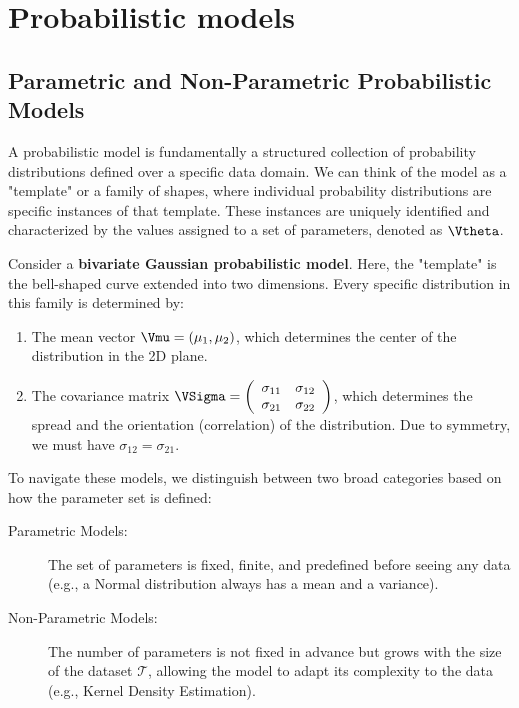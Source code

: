 \section*{Probabilistic models}

\subsection*{Parametric and Non-Parametric Probabilistic Models}

A \alert{probabilistic model} is fundamentally a structured collection of probability distributions defined over a specific data domain. We can think of the model as a "template" or a family of shapes, where individual probability distributions are specific instances of that template. These instances are uniquely identified and characterized by the values assigned to a set of \alert{parameters}, denoted as $\Vtheta$.

\begin{myexample}
Consider a \textbf{bivariate Gaussian probabilistic model}. Here, the "template" is the bell-shaped curve extended into two dimensions. Every specific distribution in this family is determined by:
\begin{enumerate}
    \item The mean vector $\Vmu = (\mu_1, \mu_2)$, which determines the center of the distribution in the 2D plane.
    \item The covariance matrix $\VSigma = \left( \begin{array}{cc} \sigma_{11} & \sigma_{12} \\ \sigma_{21} & \sigma_{22} \end{array} \right)$, which determines the spread and the orientation (correlation) of the distribution. Due to symmetry, we must have $\sigma_{12} = \sigma_{21}$.
\end{enumerate}
\end{myexample}

To navigate these models, we distinguish between two broad categories based on how the parameter set is defined:
\begin{description}
    \item[Parametric Models:] The set of parameters is fixed, finite, and predefined before seeing any data (e.g., a Normal distribution always has a mean and a variance).
    \item[Non-Parametric Models:] The number of parameters is not fixed in advance but grows with the size of the dataset $\mathcal{T}$, allowing the model to adapt its complexity to the data (e.g., Kernel Density Estimation).
\end{description}

